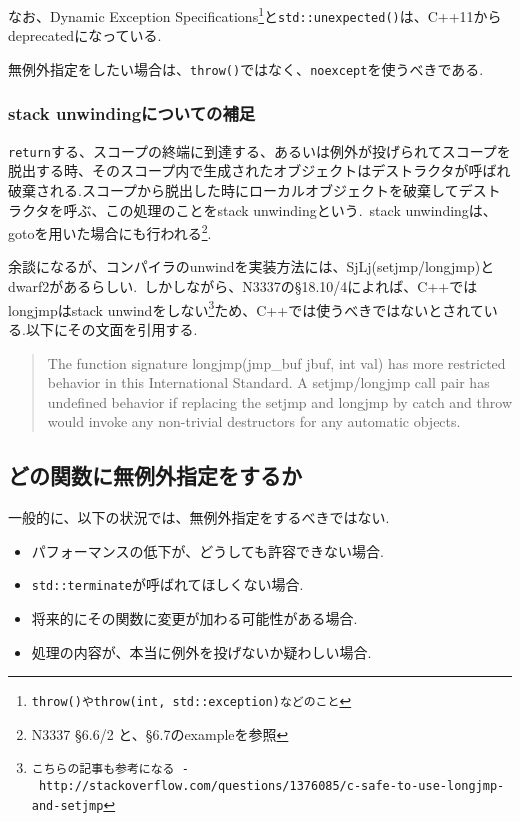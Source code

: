 \documentclass[a4j,11pt,openright]{jsbook}
\begin{document}
なお、Dynamic Exception Specifications\footnote{\texttt{throw()やthrow(int, std::exception)などのこと}}と\verb|std::unexpected()|は、C++11からdeprecatedになっている.\newline

無例外指定をしたい場合は、\verb|throw()|ではなく、\verb|noexcept|を使うべきである.

\subsubsection{stack unwindingについての補足}

\verb|return|する、スコープの終端に到達する、あるいは例外が投げられてスコープを脱出する時、そのスコープ内で生成されたオブジェクトはデストラクタが呼ばれ破棄される.スコープから脱出した時にローカルオブジェクトを破棄してデストラクタを呼ぶ、この処理のことをstack unwindingという.\ stack unwindingは、gotoを用いた場合にも行われる\footnote{N3337 \S 6.6/2 と、\S 6.7のexampleを参照}.

余談になるが、コンパイラのunwindを実装方法には、SjLj(setjmp/longjmp)とdwarf2があるらしい.\ しかしながら、N3337の\S 18.10/4によれば、C++ではlongjmpはstack unwindをしない\footnote{\texttt{こちらの記事も参考になる\ -\ http://stackoverflow.com/questions/1376085/c-safe-to-use-longjmp-and-setjmp}}ため、C++では使うべきではないとされている.以下にその文面を引用する.

\begin{quote}
    The function signature longjmp(jmp\_buf jbuf, int val) has more restricted behavior in this International
Standard. A setjmp/longjmp call pair has undefined behavior if replacing the setjmp and longjmp by catch
and throw would invoke any non-trivial destructors for any automatic objects.
\end{quote}

\subsection{どの関数に無例外指定をするか}

一般的に、以下の状況では、無例外指定をするべきではない.

\begin{itemize}
  \item パフォーマンスの低下が、どうしても許容できない場合.
  \item \verb|std::terminate|が呼ばれてほしくない場合.
  \item 将来的にその関数に変更が加わる可能性がある場合.
  \item 処理の内容が、本当に例外を投げないか疑わしい場合.
\end{itemize}
\end{document}
